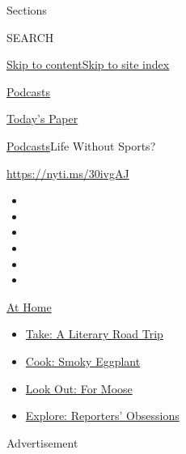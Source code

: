 Sections

SEARCH

\protect\hyperlink{site-content}{Skip to
content}\protect\hyperlink{site-index}{Skip to site index}

\href{https://www.nytimes.com/spotlight/podcasts}{Podcasts}

\href{https://myaccount.nytimes.com/auth/login?response_type=cookie\&client_id=vi}{}

\href{https://www.nytimes.com/section/todayspaper}{Today's Paper}

\href{/spotlight/podcasts}{Podcasts}\textbar{}Life Without Sports?

\url{https://nyti.ms/30ivgAJ}

\begin{itemize}
\item
\item
\item
\item
\item
\item
\end{itemize}

\href{https://www.nytimes.com/spotlight/at-home?action=click\&pgtype=Article\&state=default\&region=TOP_BANNER\&context=at_home_menu}{At
Home}

\begin{itemize}
\tightlist
\item
  \href{https://www.nytimes.com/2020/07/28/books/time-for-a-literary-road-trip.html?action=click\&pgtype=Article\&state=default\&region=TOP_BANNER\&context=at_home_menu}{Take:
  A Literary Road Trip}
\item
  \href{https://www.nytimes.com/2020/07/29/magazine/bored-with-your-home-cooking-some-smoky-eggplant-will-fix-that.html?action=click\&pgtype=Article\&state=default\&region=TOP_BANNER\&context=at_home_menu}{Cook:
  Smoky Eggplant}
\item
  \href{https://www.nytimes.com/2020/07/27/travel/moose-michigan-isle-royale.html?action=click\&pgtype=Article\&state=default\&region=TOP_BANNER\&context=at_home_menu}{Look
  Out: For Moose}
\item
  \href{https://www.nytimes.com/interactive/2020/at-home/even-more-reporters-editors-diaries-lists-recommendations.html?action=click\&pgtype=Article\&state=default\&region=TOP_BANNER\&context=at_home_menu}{Explore:
  Reporters' Obsessions}
\end{itemize}

Advertisement

